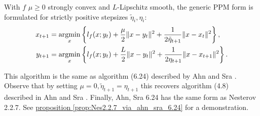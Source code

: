         \begin{definition}\label{def:agg_ppm}
            With $f$ $\mu \ge 0$ strongly convex and $L$-Lipschitz smooth, the generic PPM form is formulated for strictly positive stepsizes $\tilde \eta_i,\eta_i$: 
            \begin{align*}
                x_{t + 1} &= \mathop{\rm argmin}\limits_{x} \left\lbrace
                    l_f(x; y_t) 
                    + 
                    \frac{\mu}{2}\Vert x - y_t\Vert^2
                    + 
                    \frac{1}{2\tilde \eta_{t + 1}} \Vert x - x_t\Vert^2
                \right\rbrace, 
                \\
                y_{t + 1} &= \mathop{\rm argmin}\limits_{x} 
                \left\lbrace
                    l_f(x; y_t) + \frac{L}{2}\Vert x - y_t\Vert^2 + 
                    \frac{1}{2\eta_{t + 1}}\Vert x - x_{t + 1}\Vert^2
                \right\rbrace. 
            \end{align*}
        \end{definition}
        \begin{remark}
            This algorithm is the same as algorithm (6.24) described by Ahn and Sra \cite{ahn_understanding_2022}. 
            Observe that by setting $\mu = 0, \tilde \eta_{t + 1} = \eta_{t + 1}$ this recovers algorithm (4.8) described in Ahn and Sra \cite{ahn_understanding_2022}. 
            Finally, Ahn, Sra 6.24 has the same form as Nesterov 2.2.7. 
            See 
            \hyperref[prop:Nes2.2.7_via_ahn_sra_6.24]{proposition \ref*{prop:Nes2.2.7_via_ahn_sra_6.24}} for a demonstration. 
        \end{remark}

